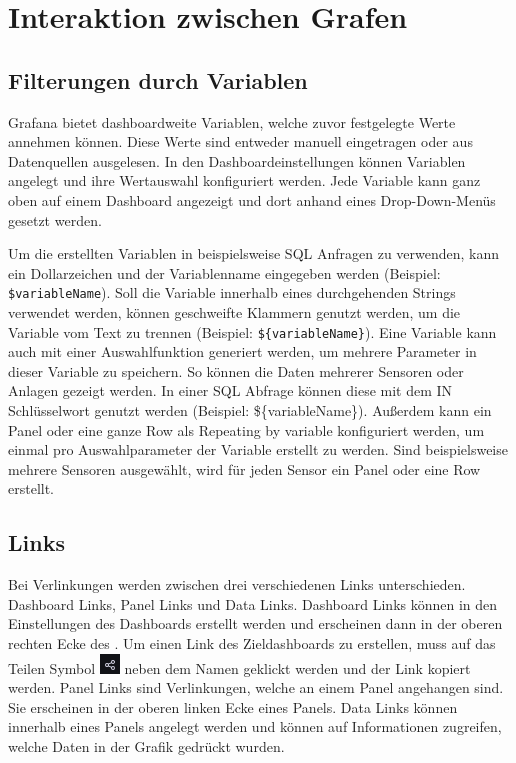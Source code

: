 \documentclass[a4paper, 12pt, oneside]{scrbook}
\begin{document}
 		
	 \section{Interaktion zwischen Grafen} \label{Interaktion zwischen Grafen}
	 	
	 	\subsection{Filterungen durch Variablen} \label{Variablen}
	 	
	 	\noindent Grafana bietet dashboardweite Variablen, welche zuvor festgelegte Werte annehmen können. Diese Werte sind entweder manuell eingetragen oder aus Datenquellen ausgelesen. In den Dashboardeinstellungen können Variablen angelegt und ihre Wertauswahl konfiguriert werden. Jede Variable kann ganz oben auf einem Dashboard angezeigt und dort anhand eines Drop-Down-Menüs gesetzt werden. 
	 	
	 	\noindent Um die erstellten Variablen in beispielsweise SQL Anfragen zu verwenden, kann ein Dollarzeichen und der Variablenname eingegeben werden (Beispiel: \texttt{\$variableName})\cite{GrafanaLabs:Variables}. Soll die Variable innerhalb eines durchgehenden Strings verwendet werden, können geschweifte Klammern genutzt werden, um die Variable vom Text zu trennen (Beispiel: \texttt{\$\{variableName\}})\cite{GrafanaLabs:Variables}. Eine Variable kann auch mit einer Auswahlfunktion generiert werden, um mehrere Parameter in dieser Variable zu speichern. So können die Daten mehrerer Sensoren oder Anlagen gezeigt werden. In einer SQL Abfrage können diese mit dem IN Schlüsselwort genutzt werden (Beispiel: \$\{variableName\})\cite{GrafanaLabs:Variables}. Außerdem kann ein Panel oder eine ganze Row als \glqq Repeating by variable \grqq{} konfiguriert werden, um einmal pro Auswahlparameter der Variable erstellt zu werden. Sind beispielsweise mehrere Sensoren ausgewählt, wird für jeden Sensor ein Panel oder eine Row erstellt.
	  	
		\subsection{Links} \label{Links}
		 
		\noindent Bei Verlinkungen werden zwischen drei verschiedenen Links unterschieden. Dashboard Links, Panel Links und Data Links. Dashboard Links können in den Einstellungen des Dashboards erstellt werden und erscheinen dann in der oberen rechten Ecke des . Um einen Link des Zieldashboards zu erstellen, muss auf das Teilen Symbol \includegraphics{res/teilensymbol.png} neben dem Namen geklickt werden und der Link kopiert werden. Panel Links sind Verlinkungen, welche an einem Panel angehangen sind. Sie erscheinen in der oberen linken Ecke eines Panels. Data Links können innerhalb eines Panels angelegt werden und können auf Informationen zugreifen, welche Daten in der Grafik gedrückt wurden. 
		
\end{document}
